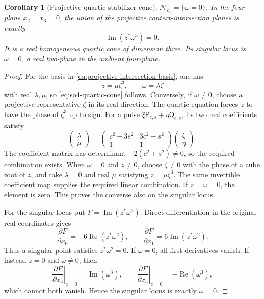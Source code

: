 \documentclass[11pt,a4paper]{article}
\newtheorem{corollary}[corollary]{Corollary}
\begin{document}
\begin{corollary}[Projective quartic stabilizer cone]
\label{cor:quartic-cone}
$\mathcal N_{e_1}=\{\omega=0\}$.  In the four-plane $x_2=x_3=0$, the union of the projective context-intersection planes is exactly
\begin{equation}
\operatorname{Im}(z^\ast\omega^3)=0.
\label{eq:so4-quartic-cone}
\end{equation}
It is a real homogeneous quartic cone of dimension three.  Its singular locus is $\omega=0$, a real two-plane in the ambient four-plane.
\end{corollary}

\begin{proof}
For the basis in \eqref{eq:projective-intersection-basis}, one has
\[
z=\mu\zeta^3,
\qquad \omega=\lambda\zeta
\]
with real $\lambda,\mu$, so \eqref{eq:so4-quartic-cone} follows.  Conversely, if $\omega\ne0$, choose a projective representative $\zeta$ in its real direction.  The quartic equation forces $z$ to have the phase of $\zeta^3$ up to sign.  For a pulse $\xi\mathsf P_{c,s}+\eta\mathsf Q_{c,s}$, its two real coefficients satisfy
\[
\begin{pmatrix}\lambda\\\mu\end{pmatrix}
=\begin{pmatrix}c^2-3s^2&3c^2-s^2\\1&1\end{pmatrix}
\begin{pmatrix}\xi\\\eta\end{pmatrix}.
\]
The coefficient matrix has determinant $-2(c^2+s^2)\ne0$, so the required
combination exists.  When $\omega=0$ and $z\ne0$, choose $\zeta\ne0$ with the phase of a cube root of $z$, and take $\lambda=0$ and real $\mu$ satisfying $z=\mu\zeta^3$.  The same invertible coefficient map supplies the required linear combination.  If $z=\omega=0$, the element is zero.  This proves the converse also on the singular locus.

For the singular locus put $F=\operatorname{Im}(z^\ast\omega^3)$.  Direct differentiation in the original real coordinates gives
\[
\frac{\partial F}{\partial x_0}=-6\operatorname{Re}(z^\ast\omega^2),
\qquad
\frac{\partial F}{\partial x_1}=6\operatorname{Im}(z^\ast\omega^2).
\]
Thus a singular point satisfies $z^\ast\omega^2=0$.  If $\omega=0$, all first derivatives vanish.  If instead $z=0$ and $\omega\ne0$, then
\[
\left.\frac{\partial F}{\partial x_4}\right|_{z=0}=\operatorname{Im}(\omega^3),
\qquad
\left.\frac{\partial F}{\partial x_5}\right|_{z=0}=-\operatorname{Re}(\omega^3),
\]
which cannot both vanish.  Hence the singular locus is exactly $\omega=0$.
\end{proof}
\end{document}
